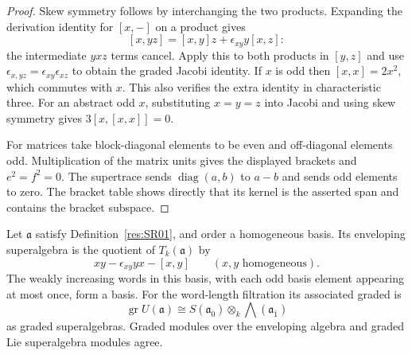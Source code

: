 \begin{proof}
Skew symmetry follows by interchanging the two products.
Expanding the derivation identity for \([x,-]\) on a
product gives
\[
 [x,yz]=[x,y]z+\epsilon_{xy}y[x,z]:
\]
the intermediate \(yxz\) terms cancel. Apply this to both
products in \([y,z]\) and use
\(\epsilon_{x,yz}=\epsilon_{xy}\epsilon_{xz}\) to obtain
the graded Jacobi identity. If \(x\) is odd then
\([x,x]=2x^2\), which commutes with \(x\). This also
verifies the extra identity in characteristic three.
For an abstract odd \(x\), substituting \(x=y=z\) into
Jacobi and using skew symmetry gives \(3[x,[x,x]]=0\).

For matrices take block-diagonal elements to be even
and off-diagonal elements odd. Multiplication of the
matrix units gives the displayed brackets
and \(e^2=f^2=0\).
The supertrace sends \(\operatorname{diag}(a,b)\)
to \(a-b\) and sends odd elements to zero. The
bracket table shows directly that its kernel is
the asserted span and contains the bracket subspace.
\end{proof}

\begin{theorem}
\label{res:SR03}
Let \(\mathfrak a\) satisfy Definition~\ref{res:SR01}, and
order a homogeneous basis. Its enveloping superalgebra is
the quotient of \(T_k(\mathfrak a)\) by
\[
 xy-\epsilon_{xy}yx-[x,y]\qquad(x,y\text{ homogeneous}).
\]
The weakly increasing words in this basis, with each
odd basis element appearing at most once, form a basis.
For the word-length filtration its associated graded is
\[
 \operatorname{gr} U(\mathfrak a)
   \cong S(\mathfrak a_{\overline 0})
              \otimes_k\bigwedge(\mathfrak a_{\overline 1})
\]
as graded superalgebras. Graded modules over the enveloping
algebra and graded Lie superalgebra modules agree.
\end{theorem}

